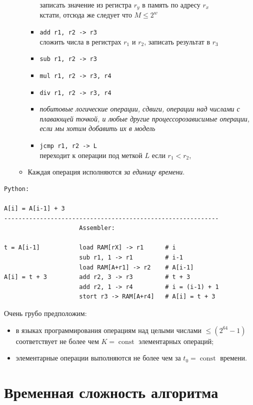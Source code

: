 \documentclass[12pt,a4paper]{report}
\def\const{\mathop{\mathrm{const}}\nolimits}
\begin{document}
\begin{itemize}
\begin{itemize}
\begin{itemize}
            записать значение из регистра $r_y$ в память по адресу $r_x$\\
            кстати, отсюда же следует что $M \leq 2^w$
      \item {\tt add r1, r2 -> r3}\\
          сложить числа в регистрах $r_1$ и $r_2$, записать результат в $r_3$
      \item {\tt sub r1, r2 -> r3}
      \item {\tt mul r1, r2 -> r3, r4}
      \item {\tt div r1, r2 -> r3, r4}
      \item {\em побитовые логические операции, сдвиги, операции над числами с плавающей точкой, и любые другие процессорозависимые операции, если мы хотим добавить их в модель}
      \item {\tt jcmp r1, r2 -> L}\\
          переходит к операции под меткой $L$ если $r_1 < r_2$,
    \end{itemize}
    \item Каждая операция исполняются {\em за единицу времени}.
  \end{itemize}
\end{itemize}

\begin{verbatim}
Python:

A[i] = A[i-1] + 3
------------------------------------------------------------
                     Assembler:

t = A[i-1]           load RAM[rX] -> r1      # i
                     sub r1, 1 -> r1         # i-1
                     load RAM[A+r1] -> r2    # A[i-1]
A[i] = t + 3         add r2, 3 -> r3         # t + 3
                     add r2, 1 -> r4         # i = (i-1) + 1
                     stort r3 -> RAM[A+r4]   # A[i] = t + 3
\end{verbatim}

Очень грубо предположим:
\begin{itemize}
\item в языках программирования операциям над целыми числами $\leq (2^{64}-1)$ соответствует не более чем $K=\const$ элементарных операций;
\item элементарные операции выполняются не более чем за $t_0=\const$ времени.
\end{itemize}


\section*{Временная сложность алгоритма}
\end{document}
